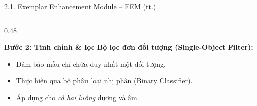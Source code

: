 \documentclass[11pt]{beamer}
\begin{document}
\begin{frame}[shrink=10]{2.1. Exemplar Enhancement Module -- EEM (tt.)}
\begin{columns}[T,onlytextwidth]
\begin{column}{0.48\textwidth}
\begin{block}{\textbf{Bước 2: Tinh chỉnh \& lọc}}
\vspace{0.3em}
\textbf{Bộ lọc đơn đối tượng (Single-Object Filter):}
\begin{itemize}
  \item Đảm bảo mẫu chỉ chứa duy nhất một đối tượng.
  \item Thực hiện qua bộ phân loại nhị phân (Binary Classifier).
  \item Áp dụng cho \emph{cả hai luồng} dương và âm.
\end{itemize}
\end{block}

\end{column}
\end{columns}

\end{frame}

\end{document}
